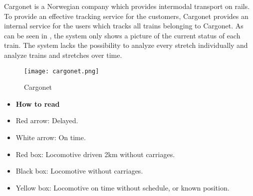 Cargonet is a Norwegian company which provides intermodal transport on rails. 
To provide an effective tracking service for the customers, Cargonet provides 
an internal service for the users which tracks all trains belonging to Cargonet.
As can be seen in , the system only shows a picture of the 
current status of each train. The system lacks the possibility to analyze 
every stretch individually and analyze trains and stretches over time.

\begin{figure}[!htbp]
	\texttt{[image: cargonet.png]}
	\caption[Cargonet]{Cargonet \cite{cargonet}}
	\label{fig:cargonet}
\end{figure}

\begin{itemize}
	\item [] \textbf{How to read }
	\item Red arrow:\hspace{4ex} Delayed.
	\item White arrow:\hspace{4ex} On time.
	\item Red box:\hspace{4ex} Locomotive driven 2km without carriages.
	\item Black box:\hspace{4ex} Locomotive without carriages.
	\item Yellow box:\hspace{4ex} Locomotive on time without schedule, or known position.
\end{itemize}

